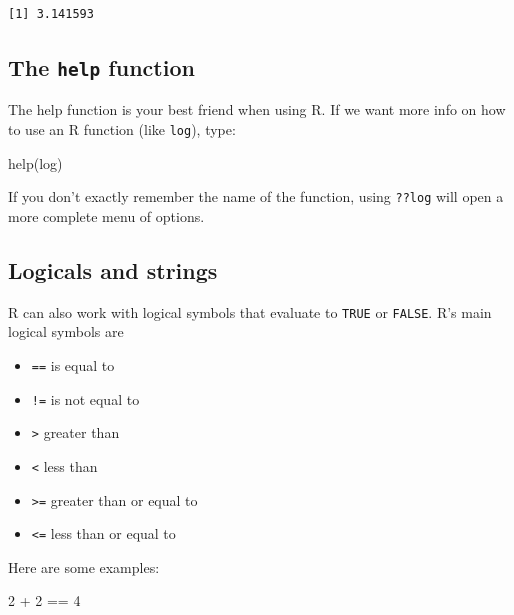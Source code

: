 \documentclass[
  letterpaper,
  DIV=11,
  numbers=noendperiod]{scrreprt}
\newenvironment{Shaded}{\begin{snugshade}}{\end{snugshade}}
\newcommand{\DecValTok}[1]{\textcolor[rgb]{0.68,0.00,0.00}{#1}}
\newcommand{\FunctionTok}[1]{\textcolor[rgb]{0.28,0.35,0.67}{#1}}
\newcommand{\NormalTok}[1]{\textcolor[rgb]{0.00,0.23,0.31}{#1}}
\newcommand{\SpecialCharTok}[1]{\textcolor[rgb]{0.37,0.37,0.37}{#1}}
\providecommand{\tightlist}{%
  \setlength{\itemsep}{0pt}\setlength{\parskip}{0pt}}\usepackage{longtable,booktabs,array}
\begin{document}
\begin{verbatim}
[1] 3.141593
\end{verbatim}

\hypertarget{the-help-function}{%
\subsection{\texorpdfstring{The \texttt{help}
function}{The help function}}\label{the-help-function}}

The help function is your best friend when using R. If we want more info
on how to use an R function (like \texttt{log}), type:

\begin{Shaded}
\begin{Highlighting}[]
\FunctionTok{help}\NormalTok{(log)}
\end{Highlighting}
\end{Shaded}

If you don't exactly remember the name of the function, using
\texttt{??log} will open a more complete menu of options.

\hypertarget{logicals-and-strings}{%
\subsection{Logicals and strings}\label{logicals-and-strings}}

R can also work with logical symbols that evaluate to \texttt{TRUE} or
\texttt{FALSE}. R's main logical symbols are

\begin{itemize}
\tightlist
\item
  \texttt{==} is equal to
\item
  \texttt{!=} is not equal to
\item
  \texttt{\textgreater{}} greater than
\item
  \texttt{\textless{}} less than
\item
  \texttt{\textgreater{}=} greater than or equal to
\item
  \texttt{\textless{}=} less than or equal to
\end{itemize}

Here are some examples:

\begin{Shaded}
\begin{Highlighting}[]
\DecValTok{2} \SpecialCharTok{+} \DecValTok{2} \SpecialCharTok{==} \DecValTok{4}
\end{Highlighting}
\end{Shaded}
\end{document}
